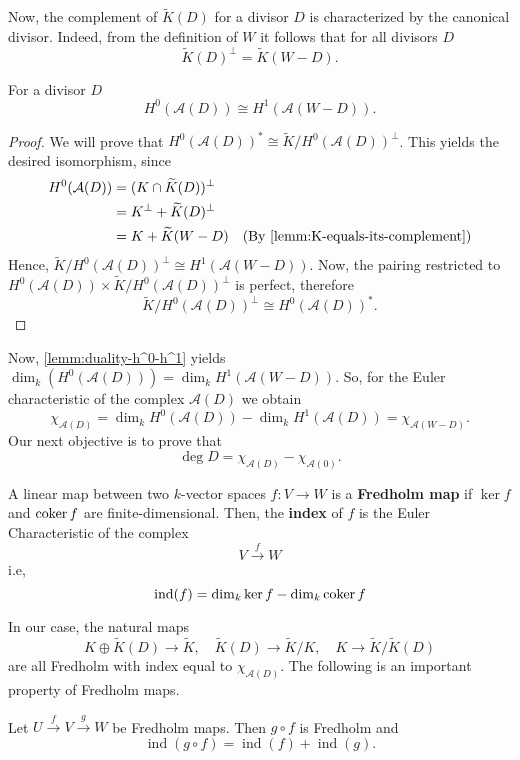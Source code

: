 Now, the complement of $\widetilde{K}(D)$ for a divisor $D$ is characterized by the canonical divisor. Indeed, from the definition of $W$ it follows that for all divisors $D$
\[
	\widetilde{K}(D)^{\perp} = \widetilde{K}(W - D).
\]
\begin{lemma}\label{lemm:duality-h^0-h^1}
	For a divisor $D$
	\[
		H^{0}(\mathcal{A}(D)) \cong H^{1}(\mathcal{A}(W - D)).
	\]
\end{lemma}
\begin{proof}
	We will prove that $H^{0}(\mathcal{A}(D))^{*}\cong \widetilde{K}/H^{0}(\mathcal{A}(D))^{\perp}$. This yields the desired isomorphism, since
	\begin{align*}
		H^{0}(\mathcal{A}(D)) &= (K\cap \widetilde{K}(D))^{\perp}\\
		&= K^{\perp} + \widetilde{K}(D)^{\perp} \\
		&= K + \widetilde{K}(W - D) \quad (\text{By }\cref{lemm:K-equals-its-complement})
	\end{align*}
	Hence, $\widetilde{K}/H^{0}(\mathcal{A}(D))^{\perp} \cong H^{1}(\mathcal{A}(W - D))$. Now, the pairing restricted to $H^{0}(\mathcal{A}(D)) \times \widetilde{K}/H^{0}(\mathcal{A}(D))^{\perp}$ is perfect, therefore
	\[
		\widetilde{K}/H^{0}(\mathcal{A}(D))^{\perp} \cong H^{0}(\mathcal{A}(D))^{*}.
	\]
\end{proof}
Now, \cref{lemm:duality-h^0-h^1} yields $\dim_{k}(H^{0}(\mathcal{A}(D))) = \dim_{k}H^{1}(\mathcal{A}(W - D))$. So, for the Euler characteristic of the complex $\mathcal{A}(D)$ we obtain
\[
	\chi_{\mathcal{A}(D)} = \dim_{k}H^{0}(\mathcal{A}(D)) - \dim_{k}H^{1}(\mathcal{A}(D)) = \chi_{\mathcal{A}(W - D)}.
\]
Our next objective is to prove that
\[
	\deg D =  \chi_{\mathcal{A}(D)} - \chi_{\mathcal{A}(0)}.
\]
\begin{definition}\label{def:fredholm-map}
	A linear map between two $k$-vector spaces $f\colon V \to W$ is a \textbf{Fredholm map} if $\ker f$ and $\operatorname{coker} f$ are finite-dimensional. Then, the \textbf{index} of $f$ is the Euler Characteristic of the complex
	\[
		V \xrightarrow{f} W
	\]
	i.e,
	\[
		\operatorname{ind}(f) = \dim_{k}\ker f - \dim_{k}\operatorname{coker} f
	\]
\end{definition}
In our case, the natural maps
\[
	K\oplus \widetilde{K}(D) \to \widetilde{K}, \quad \widetilde{K}(D) \to \widetilde{K}/K, \quad K\to \widetilde{K}/\widetilde{K}(D)
\]
are all Fredholm with index equal to $\chi_{\mathcal{A}(D)}$. The following is an important property of Fredholm maps.
\begin{lemma}\label{lemm:additivity-of-index-composition}
	Let $U \xrightarrow{f} V \xrightarrow{g} W$ be Fredholm maps. Then $g \circ f$ is Fredholm and
	\[
		\operatorname{ind}(g \circ f) = \operatorname{ind}(f) + \operatorname{ind}(g).
	\]
\end{lemma}
